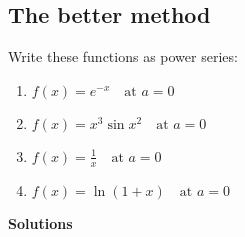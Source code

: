 \subsection*{The better method}
\eg Write these functions as power series: \begin{enumerate}
    \item \(f(x) = e^{-x} \quad \text{at } a = 0\)
    \item \(f(x) = x^3 \sin x^2 \quad \text{at } a = 0\)
    \item \(f(x) = \frac{1}{x} \quad \text{at } a = 0\)
    \item \(f(x) = \ln (1+x) \quad \text{at } a = 0\)
\end{enumerate}
\textbf{Solutions}
